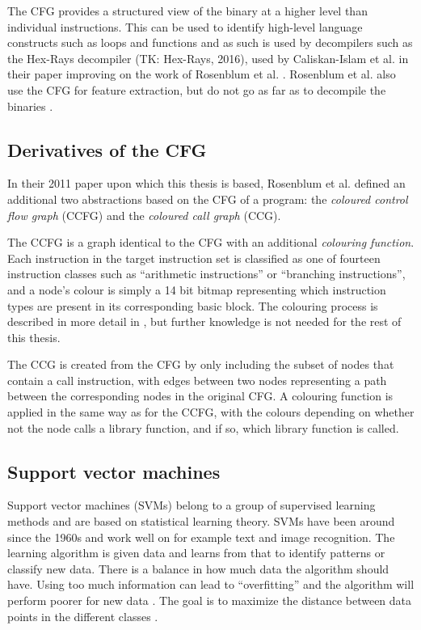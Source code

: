 \documentclass[a4paper,11pt]{kth-mag}
\begin{document}
The CFG provides a structured view of the binary at a higher level than
individual instructions. This can be used to identify high-level language
constructs such as loops and functions \parencite{cifuentes1993methodology} and
as such is used by decompilers such as the Hex-Rays decompiler (TK: Hex-Rays,
2016), used by Caliskan-Islam et al. in their paper improving on the work of
Rosenblum et al. \parencite{caliskan2015coding}. Rosenblum et al. also use the
CFG for feature extraction, but do not go as far as to decompile the binaries
\parencite{rosenblum2011wrote}.

\subsection{Derivatives of the CFG}
In their 2011 paper upon which this thesis is based, Rosenblum et al. defined
an additional two abstractions based on the CFG of a program: the
\emph{coloured control flow graph} (CCFG) and the \emph{coloured call graph}
(CCG).

The CCFG is a graph identical to the CFG with an additional \emph{colouring
function}. Each instruction in the target instruction set is classified as one
of fourteen instruction classes such as ``arithmetic instructions'' or
``branching instructions'', and a node's colour is simply a 14 bit bitmap
representing which instruction types are present in its corresponding basic
block. The colouring process is described in more detail in
\parencite{rosenblum2011recovering}, but further knowledge is not needed for
the rest of this thesis.

The CCG is created from the CFG by only including the subset of nodes that contain
a call instruction, with edges between two nodes representing a path between
the corresponding nodes in the original CFG. A colouring function is applied in
the same way as for the CCFG, with the colours depending on whether not the
node calls a library function, and if so, which library function is called.

\subsection{Support vector machines}
Support vector machines (SVMs) belong to a group of supervised learning methods
and are based on statistical learning theory. SVMs have been around since the
1960s and work well on for example text and image recognition. The learning
algorithm is given data and learns from that to identify patterns or classify
new data. There is a balance in how much data the algorithm should have. Using
too much information can lead to ``overfitting'' and the algorithm will perform
poorer for new data \parencite{cristianini2000introduction}. The goal is to
maximize the distance between data points in the different classes
 \parencite{awad2004effective}. 
\end{document}
